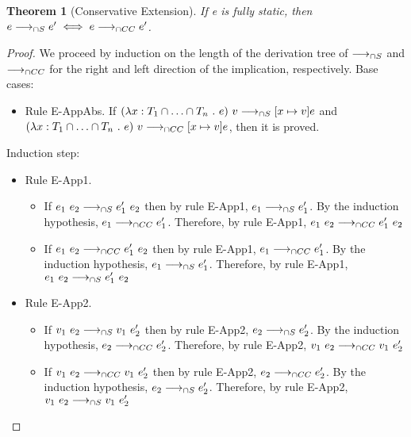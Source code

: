 \documentclass[a4paper]{article}
\newtheorem{theorem}{Theorem}
\begin{document}
\begin{theorem}[Conservative Extension]
\label{conservative_extension_operational_semantics}
If e is fully static, then $e \longrightarrow_{\cap S} e' \iff e \longrightarrow_{\cap CC} e'$.
\end{theorem}
\begin{proof}
We proceed by induction on the length of the derivation tree of $\longrightarrow_{\cap S}$ and $\longrightarrow_{\cap CC}$ for the right and left direction of the implication, respectively.
Base cases:
\begin{itemize}
    \item Rule E-AppAbs.
    If $(\lambda x : T_1 \cap \ldots \cap T_n\ .\ e)\ v \longrightarrow_{\cap S} [x \mapsto v]e$ and $(\lambda x : T_1 \cap \ldots \cap T_n\ .\ e)\ v \longrightarrow_{\cap CC} [x \mapsto v]e$, then it is proved.
\end{itemize}
Induction step:
\begin{itemize}
    \item Rule E-App1.
    \begin{itemize}
        \item If $e_1\ e_2 \sios e_1'\ e_2$ then by rule E-App1, $e_1 \longrightarrow_{\cap S} e_1'$.
        By the induction hypothesis, $e_1 \longrightarrow_{\cap CC} e_1'$.
        Therefore, by rule E-App1, $e_1\ e_2 \gios e_1'\ e_2$
        \item If $e_1\ e_2 \gios e_1'\ e_2$ then by rule E-App1, $e_1 \longrightarrow_{\cap CC} e_1'$.
        By the induction hypothesis, $e_1 \longrightarrow_{\cap S} e_1'$.
        Therefore, by rule E-App1, $e_1\ e_2 \sios e_1'\ e_2$
    \end{itemize}
    \item Rule E-App2.
    \begin{itemize}
        \item If $v_1\ e_2 \sios v_1\ e_2'$ then by rule E-App2, $e_2 \longrightarrow_{\cap S} e_2'$.
        By the induction hypothesis, $e_2 \longrightarrow_{\cap CC} e_2'$.
        Therefore, by rule E-App2, $v_1\ e_2 \gios v_1\ e_2'$
        \item If $v_1\ e_2 \gios v_1\ e_2'$ then by rule E-App2, $e_2 \longrightarrow_{\cap CC} e_2'$.
        By the induction hypothesis, $e_2 \longrightarrow_{\cap S} e_2'$.
        Therefore, by rule E-App2, $v_1\ e_2 \sios v_1\ e_2'$
    \end{itemize}
\end{itemize}
\end{proof}
\end{document}
